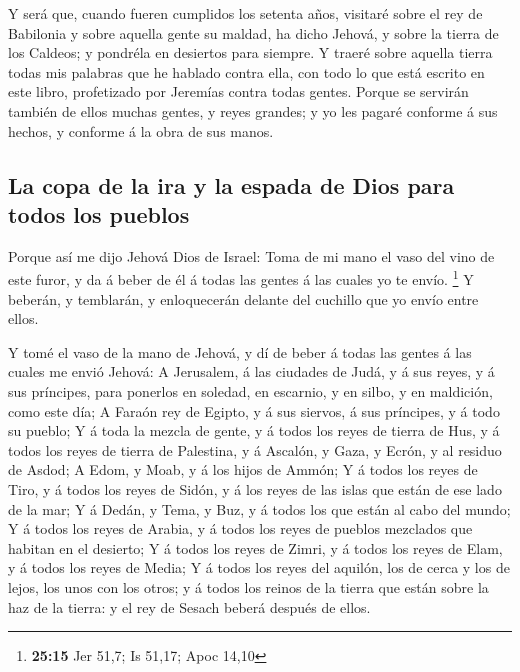  Y será que, cuando fueren cumplidos los setenta años,
visitaré sobre el rey de Babilonia y sobre aquella gente su maldad, ha
dicho Jehová, y sobre la tierra de los Caldeos; y pondréla en desiertos
para siempre.  Y traeré sobre aquella tierra todas mis
palabras que he hablado contra ella, con todo lo que está escrito en
este libro, profetizado por Jeremías contra todas gentes. 
Porque se servirán también de ellos muchas gentes, y reyes grandes; y yo
les pagaré conforme á sus hechos, y conforme á la obra de sus manos.

\hypertarget{la-copa-de-la-ira-y-la-espada-de-dios-para-todos-los-pueblos}{%
\subsection{La copa de la ira y la espada de Dios para todos los
pueblos}\label{la-copa-de-la-ira-y-la-espada-de-dios-para-todos-los-pueblos}}

 Porque así me dijo Jehová Dios de Israel: Toma de mi mano
el vaso del vino de este furor, y da á beber de él á todas las gentes á
las cuales yo te envío. \footnote{\textbf{25:15} Jer 51,7; Is 51,17;
  Apoc 14,10}  Y beberán, y temblarán, y enloquecerán
delante del cuchillo que yo envío entre ellos.

 Y tomé el vaso de la mano de Jehová, y dí de beber á todas
las gentes á las cuales me envió Jehová:  A Jerusalem, á
las ciudades de Judá, y á sus reyes, y á sus príncipes, para ponerlos en
soledad, en escarnio, y en silbo, y en maldición, como este día;
 A Faraón rey de Egipto, y á sus siervos, á sus príncipes,
y á todo su pueblo;  Y á toda la mezcla de gente, y á todos
los reyes de tierra de Hus, y á todos los reyes de tierra de Palestina,
y á Ascalón, y Gaza, y Ecrón, y al residuo de Asdod;  A
Edom, y Moab, y á los hijos de Ammón;  Y á todos los reyes
de Tiro, y á todos los reyes de Sidón, y á los reyes de las islas que
están de ese lado de la mar;  Y á Dedán, y Tema, y Buz, y á
todos los que están al cabo del mundo;  Y á todos los reyes
de Arabia, y á todos los reyes de pueblos mezclados que habitan en el
desierto;  Y á todos los reyes de Zimri, y á todos los
reyes de Elam, y á todos los reyes de Media;  Y á todos los
reyes del aquilón, los de cerca y los de lejos, los unos con los otros;
y á todos los reinos de la tierra que están sobre la haz de la tierra: y
el rey de Sesach beberá después de ellos.


